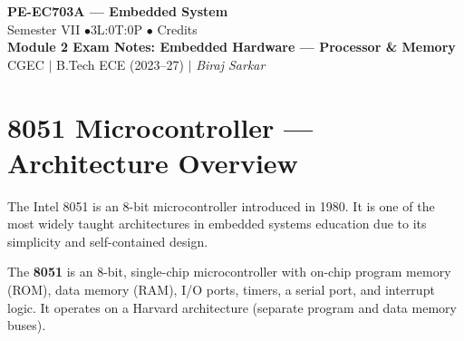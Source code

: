 \documentclass[12pt,a4paper]{article}
\begin{document}

\begin{center}
  {\LARGE\bfseries\color{myred} PE-EC703A --- Embedded System}\\[5pt]
  {\normalsize\color{mydark} Semester VII \quad$\bullet$\quad 3L:0T:0P \quad$\bullet$ Credits}\\[3pt]
  {\normalsize\color{myteal}\textbf{Module 2 Exam Notes: Embedded Hardware --- Processor \& Memory}}\\[3pt]
  {\small\color{mydark} CGEC \;$|$\; B.Tech ECE (2023--27) \;$|$\; \textit{Biraj Sarkar}}
\end{center}
\vspace{2pt}
\noindent{\color{myred}\rule{\linewidth}{1.5pt}}
\vspace{2pt}

\hypersetup{linkcolor=mydark}
\tableofcontents
\hypersetup{linkcolor=myteal}
\newpage

\section{8051 Microcontroller --- Architecture Overview}

The Intel 8051 is an 8-bit microcontroller introduced in 1980. It is one of the most widely taught architectures in embedded systems education due to its simplicity and self-contained design.

\begin{tcolorbox}[defbox, title={\textbf{8051 Microcontroller}}]
The \textbf{8051} is an 8-bit, single-chip microcontroller with on-chip program memory (ROM), data memory (RAM), I/O ports, timers, a serial port, and interrupt logic. It operates on a Harvard architecture (separate program and data memory buses).
\end{tcolorbox}
\end{document}

